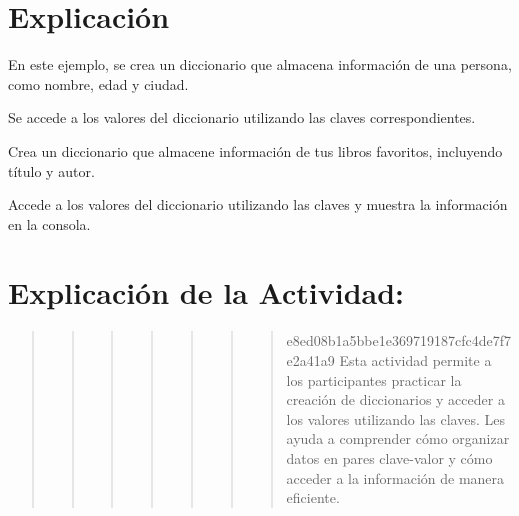 \documentclass[
  a4paper,
  onepage,
  openany]{scrreprt}
\begin{document}
\hypertarget{explicaciuxf3n-25}{%
\section{Explicación}\label{explicaciuxf3n-25}}

En este ejemplo, se crea un diccionario que almacena información de una
persona, como nombre, edad y ciudad.

Se accede a los valores del diccionario utilizando las claves
correspondientes.

\begin{tcolorbox}[enhanced jigsaw, breakable, opacityback=0, toptitle=1mm, coltitle=black, toprule=.15mm, rightrule=.15mm, colframe=quarto-callout-important-color-frame, opacitybacktitle=0.6, arc=.35mm, title=\textcolor{quarto-callout-important-color}{\faExclamation}\hspace{0.5em}{Actividad Práctica}, titlerule=0mm, colbacktitle=quarto-callout-important-color!10!white, bottomtitle=1mm, bottomrule=.15mm, colback=white, left=2mm, leftrule=.75mm]

Crea un diccionario que almacene información de tus libros favoritos,
incluyendo título y autor.

Accede a los valores del diccionario utilizando las claves y muestra la
información en la consola.

\end{tcolorbox}

\hypertarget{explicaciuxf3n-de-la-actividad-23}{%
\section{Explicación de la
Actividad:}\label{explicaciuxf3n-de-la-actividad-23}}

\begin{quote}
\begin{quote}
\begin{quote}
\begin{quote}
\begin{quote}
\begin{quote}
\begin{quote}
e8ed08b1a5bbe1e369719187cfc4de7f7e2a41a9 Esta actividad permite a los
participantes practicar la creación de diccionarios y acceder a los
valores utilizando las claves. Les ayuda a comprender cómo organizar
datos en pares clave-valor y cómo acceder a la información de manera
eficiente.
\end{quote}
\end{quote}
\end{quote}
\end{quote}
\end{quote}
\end{quote}
\end{quote}
\end{document}
